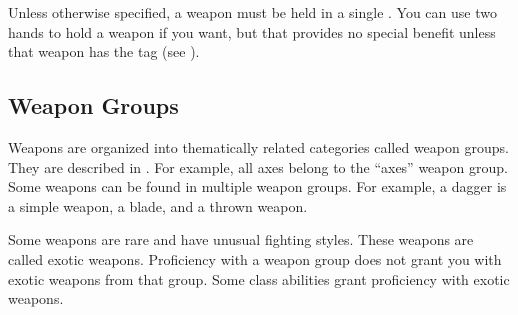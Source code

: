   Unless otherwise specified, a weapon must be held in a single .
  You can use two hands to hold a weapon if you want, but that provides no special benefit unless that weapon has the  tag (see ).

  \subsection{Weapon Groups}\label{Weapon Groups}
    Weapons are organized into thematically related categories called weapon groups. They are described in . For example, all axes belong to the ``axes'' weapon group. Some weapons can be found in multiple weapon groups. For example, a dagger is a simple weapon, a blade, and a thrown weapon.

     Some weapons are rare and have unusual fighting styles.
    These weapons are called exotic weapons.
    Proficiency with a weapon group does not grant you with exotic weapons from that group.
    Some class abilities grant proficiency with exotic weapons.

